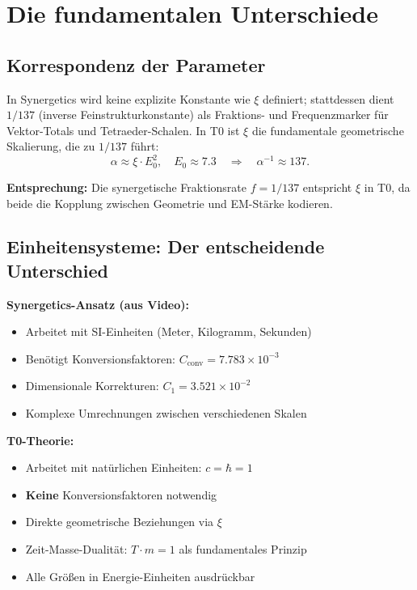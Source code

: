 \documentclass[12pt,a4paper]{article}
\newcommand{\xipar}{\xi}
\begin{document}
	\section{Die fundamentalen Unterschiede}
	
	\subsection{Korrespondenz der Parameter}
	
	In Synergetics wird keine explizite Konstante wie $\xipar$ definiert; stattdessen dient $1/137$ (inverse Feinstrukturkonstante) als Fraktions- und Frequenzmarker für Vektor-Totals und Tetraeder-Schalen. In T0 ist $\xipar$ die fundamentale geometrische Skalierung, die zu $1/137$ führt:
	\begin{equation}
		\alpha \approx \xipar \cdot E_0^2, \quad E_0 \approx 7.3 \quad \Rightarrow \quad \alpha^{-1} \approx 137.
	\end{equation}
	
	\textbf{Entsprechung:} Die synergetische Fraktionsrate $f = 1/137$ entspricht $\xipar$ in T0, da beide die Kopplung zwischen Geometrie und EM-Stärke kodieren.
	
	\subsection{Einheitensysteme: Der entscheidende Unterschied}
	
	\begin{vergleich}
		\textbf{Synergetics-Ansatz (aus Video):}
		\begin{itemize}
			\item Arbeitet mit SI-Einheiten (Meter, Kilogramm, Sekunden)
			\item Benötigt Konversionsfaktoren: $C_{\text{conv}} = 7.783 \times 10^{-3}$
			\item Dimensionale Korrekturen: $C_1 = 3.521 \times 10^{-2}$
			\item Komplexe Umrechnungen zwischen verschiedenen Skalen
		\end{itemize}
		
		\textbf{T0-Theorie:}
		\begin{itemize}
			\item Arbeitet mit natürlichen Einheiten: $c = \hbar = 1$
			\item \textbf{Keine} Konversionsfaktoren notwendig
			\item Direkte geometrische Beziehungen via $\xipar$
			\item Zeit-Masse-Dualität: $T \cdot m = 1$ als fundamentales Prinzip
			\item Alle Größen in Energie-Einheiten ausdrückbar
		\end{itemize}
	\end{vergleich}
	
\end{document}
